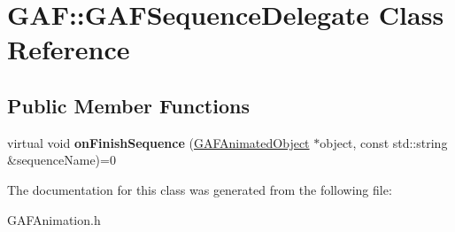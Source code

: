 \hypertarget{class_g_a_f_1_1_g_a_f_sequence_delegate}{\section{G\-A\-F\-:\-:G\-A\-F\-Sequence\-Delegate Class Reference}
\label{class_g_a_f_1_1_g_a_f_sequence_delegate}
}
\subsection*{Public Member Functions}
\begin{DoxyCompactItemize}
\item 
\hypertarget{class_g_a_f_1_1_g_a_f_sequence_delegate_a64ea0486b234e10342b1987e13817ab3}{virtual void {\bfseries on\-Finish\-Sequence} (\hyperlink{class_g_a_f_1_1_g_a_f_animated_object}{G\-A\-F\-Animated\-Object} $\ast$object, const std\-::string \&sequence\-Name)=0}\label{class_g_a_f_1_1_g_a_f_sequence_delegate_a64ea0486b234e10342b1987e13817ab3}

\end{DoxyCompactItemize}


The documentation for this class was generated from the following file\-:\begin{DoxyCompactItemize}
\item 
G\-A\-F\-Animation.\-h\end{DoxyCompactItemize}
